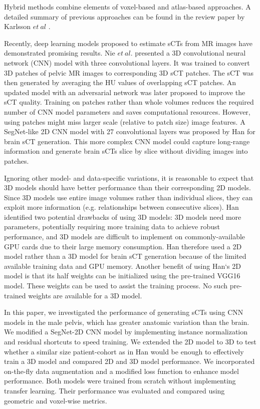 Hybrid methods combine elements of voxel-based and atlas-based approaches.\cite{RN11,RN23} A detailed summary of previous approaches can be found in the review paper by Karlsson $et \ al$ {\cite{RN8}}. 

Recently, deep learning models\cite{RN24} proposed to estimate sCTs from MR images have demonstrated promising results. Nie $et \ al.$ \cite{RN25} presented a 3D convolutional neural network (CNN) model with three convolutional layers. It was trained to convert 3D patches of pelvic MR images to corresponding 3D sCT patches. The sCT was then generated by averaging the HU values of overlapping sCT patches. An updated model with an adversarial network\cite{RN26} was later proposed to improve the sCT quality. Training on patches rather than whole volumes reduces the required number of CNN model parameters and saves computational resources. However, using patches might miss larger scale (relative to patch size) image features. A SegNet-like 2D CNN model with 27 convolutional layers was proposed by Han for brain sCT generation. This more complex CNN model could capture long-range information and generate brain sCTs slice by slice without dividing images into patches\cite{RN27,RN28}. 

Ignoring other model- and data-specific variations, it is reasonable to expect that 3D models should have better performance than their corresponding 2D models. Since 3D models use entire image volumes rather than individual slices, they can exploit more information (e.g. relationships between consecutive slices). Han identified two potential drawbacks of using 3D models: 3D models need more parameters, potentially requiring more training data to achieve robust performance, and 3D models are difficult to implement on commonly-available GPU cards due to their large memory consumption.\cite{RN28} Han therefore used a 2D model rather than a 3D model for brain sCT generation because of the limited available training data and GPU memory\cite{RN28}. Another benefit of using Han`s 2D model\cite{RN28} is that its half weights can be initialized using the pre-trained VGG16 model{\cite{RN29}}. These weights can be used to assist the training process. No such pre-trained weights are available for a 3D model. 

In this paper, we investigated the performance of generating sCTs using CNN models in the male pelvis, which has greater anatomic variation than the brain.  We modified a SegNet-2D CNN model by implementing instance normalization\cite{RN34} and residual shortcuts\cite{RN36} to speed training. We extended the 2D model to 3D to test whether a similar size patient-cohort as in Han\cite{RN28} would be enough to effectively train a 3D model and compared 2D and 3D model performance. We incorporated on-the-fly data augmentation and a modified loss function to enhance model performance. Both models were trained from scratch without implementing transfer learning. Their performance was evaluated and compared using geometric and voxel-wise metrics.

